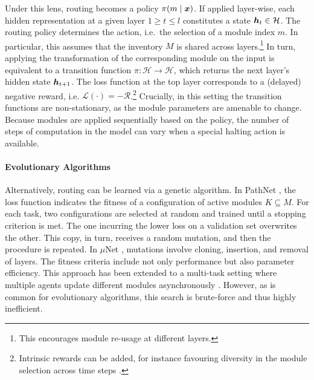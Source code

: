 \documentclass[10pt]{article} %
\begin{document}
Under this lens, routing becomes a policy $\pi(m \mid {\bm{x}})$. If applied layer-wise, each hidden representation at a given layer $1 \geq t \leq l$ constitutes a state ${\bm{h}}_t \in \mathcal{H}$. The routing policy determines the action, i.e.\ the selection of a module index $m$. In particular, this assumes that the inventory $M$ is shared across layers.\footnote{This encourages module re-usage at different layers.}
In turn, applying the transformation of the corresponding module on the input is equivalent to a transition function $\pi : \mathcal{H} \rightarrow \mathcal{H}$, which returns the next layer's hidden state ${\bm{h}}_{t + 1}$. The loss function at the top layer corresponds to a (delayed) negative reward, i.e. $\mathcal{L}(\cdot) = - \mathcal{R}$.\footnote{Intrinsic rewards can be added, for instance favouring diversity in the module selection across time steps \citep{rosenbaum2017routing}.} Crucially, in this setting the transition functions are non-stationary, as the module parameters are amenable to change. Because modules are applied sequentially based on the policy, the number of steps of computation in the model can vary when a special halting action is available.

\paragraph*{Evolutionary Algorithms}
Alternatively, routing can be learned via a genetic algorithm. In PathNet \citep{fernando2017pathnet}, the loss function indicates the fitness of a configuration of active modules $K \subseteq M$.
For each task, two configurations are selected at random and trained until a stopping criterion is met. The one incurring the lower loss on a validation set overwrites the other. This copy, in turn, receives a random mutation, and then the procedure is repeated. In $\mu$Net \citep{Gesmundo2022Evolutionary,Gesmundo2022munet}, mutations involve cloning, insertion, and removal of layers. The fitness criteria include not only performance but also parameter efficiency. This approach has been extended to a multi-task setting where multiple agents update different modules asynchronously
\citep{Gesmundo2022Multiagent}. However, as is common for evolutionary algorithms, this search is brute-force and thus highly inefficient.
\end{document}
